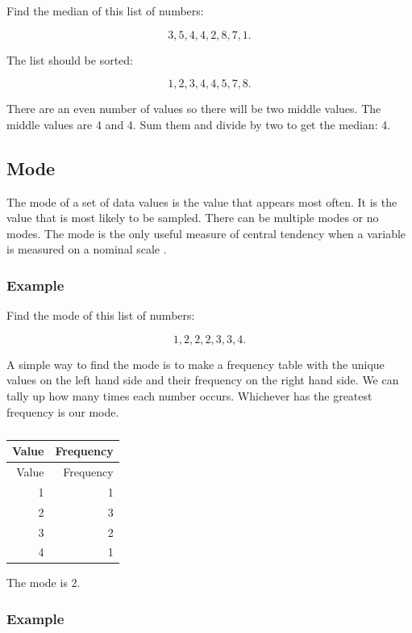\documentclass[
]{book}
\begin{document}
Find the median of this list of numbers:

\[ 3, 5, 4, 4, 2, 8, 7, 1.\]

The list should be sorted:

\[ 1, 2, 3, 4, 4, 5, 7, 8. \]

There are an even number of values so there will be two middle values. The middle values are 4 and 4. Sum them and divide by two to get the median: 4.

\hypertarget{mode}{%
\subsection{Mode}\label{mode}}

The mode of a set of data values is the value that appears most often. It is the value that is most likely to be sampled. There can be multiple modes or no modes. The mode is the only useful measure of central tendency when a variable is measured on a nominal scale \citep{mchugh3}.

\hypertarget{example-3}{%
\subsubsection{Example}\label{example-3}}

Find the mode of this list of numbers:

\[ 1, 2, 2, 2, 3, 3, 4.\]

A simple way to find the mode is to make a frequency table with the unique values on the left hand side and their frequency on the right hand side. We can tally up how many times each number occurs. Whichever has the greatest frequency is our mode.

\begin{longtable}[]{@{}rr@{}}
\caption{\label{tab:table2}}\tabularnewline
\toprule
Value & Frequency \\
\midrule
\endfirsthead
\toprule
Value & Frequency \\
\midrule
\endhead
1 & 1 \\
2 & 3 \\
3 & 2 \\
4 & 1 \\
\bottomrule
\end{longtable}

The mode is 2.

\hypertarget{example-4}{%
\subsubsection{Example}\label{example-4}}
\end{document}
